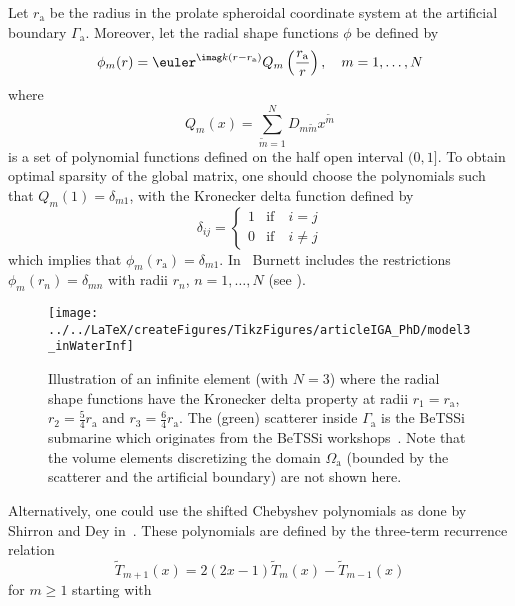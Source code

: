 Let $r_{\mathrm{a}}$ be the radius in the prolate spheroidal coordinate system at the artificial boundary $\Gamma_{\mathrm{a}}$. Moreover, let the radial shape functions $\phi$ be defined by
\begin{equation}
	\phi_m(r) = \euler^{\imag k (r-r_{\mathrm{a}})}Q_m\left(\frac{r_{\mathrm{a}}}{r}\right),\quad m = 1,\dots,N
\end{equation}
where 
\begin{equation}\label{Eq2:Q_m}
	Q_m(x) = \sum_{\tilde{m}=1}^N D_{m\tilde{m}} x^{\tilde{m}}
\end{equation}
is a set of polynomial functions defined on the half open interval $(0,1]$. To obtain optimal sparsity of the global matrix, one should choose the polynomials such that $Q_m(1) = \delta_{m1}$, with the Kronecker delta function defined by
\begin{equation}\label{Eq2:Kronecker}
	\delta_{ij} = \begin{cases}
		1 & \text{if}\quad i = j\\
		0 & \text{if}\quad i \neq j
		\end{cases}
\end{equation}
which implies that $\phi_m(r_{\mathrm{a}}) = \delta_{m1}$. In~\cite{Burnett1994atd} Burnett includes the restrictions $\phi_m(r_n) = \delta_{mn}$ with radii $r_n$, $n=1,\dots,N$ (see ).
\begin{figure}
	\centering
	\texttt{[image: ../../LaTeX/createFigures/TikzFigures/articleIGA\_PhD/model3\_inWaterInf]}
	\caption{Illustration of an infinite element (with $N=3$) where the radial shape functions have the Kronecker delta property at radii $r_1=r_{\mathrm{a}}$, $r_2=\frac54 r_{\mathrm{a}}$ and ${r_3=\frac64 r_{\mathrm{a}}}$. The (green) scatterer inside $\Gamma_{\mathrm{a}}$ is the BeTSSi submarine which originates from the BeTSSi workshops~\cite{Gilroy2013bib}. Note that the volume elements discretizing the domain $\Omega_{\mathrm{a}}$ (bounded by the scatterer and the artificial boundary) are not shown here.}
	\label{Fig2:model3_in_waterInf}
\end{figure} 
Alternatively, one could use the shifted Chebyshev polynomials as done by Shirron and Dey in~\cite{Shirron2002aie}. These polynomials are defined by the three-term recurrence relation
\begin{equation}
	\tilde{T}_{m+1}(x) = 2(2x-1)\tilde{T}_m(x) - \tilde{T}_{m-1}(x)
\end{equation}
for $m\geq 1$ starting with
